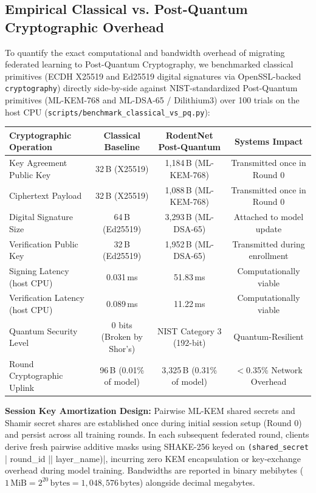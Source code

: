 \documentclass[11pt,a4paper]{article}
\begin{document}
\subsection{Empirical Classical vs. Post-Quantum Cryptographic Overhead}
To quantify the exact computational and bandwidth overhead of migrating federated learning to Post-Quantum Cryptography, we benchmarked classical primitives (ECDH X25519 and Ed25519 digital signatures via OpenSSL-backed \lstinline|cryptography|) directly side-by-side against NIST-standardized Post-Quantum primitives (ML-KEM-768 and ML-DSA-65 / Dilithium3) over 100 trials on the host CPU (\lstinline|scripts/benchmark_classical_vs_pq.py|):

\begin{center}
\begin{longtable}{@{}p{5.0cm}ccc@{}}
\toprule
\textbf{Cryptographic Operation} & \textbf{Classical Baseline} & \textbf{RodentNet Post-Quantum} & \textbf{Systems Impact} \\
\midrule
\endhead
Key Agreement Public Key & 32\,B (X25519) & 1{,}184\,B (ML-KEM-768) & Transmitted once in Round 0 \\
Ciphertext Payload & 32\,B (X25519) & 1{,}088\,B (ML-KEM-768) & Transmitted once in Round 0 \\
Digital Signature Size & 64\,B (Ed25519) & 3{,}293\,B (ML-DSA-65) & Attached to model update \\
Verification Public Key & 32\,B (Ed25519) & 1{,}952\,B (ML-DSA-65) & Transmitted during enrollment \\
Signing Latency (host CPU) & 0.031\,ms & 51.83\,ms & Computationally viable \\
Verification Latency (host CPU) & 0.089\,ms & 11.22\,ms & Computationally viable \\
Quantum Security Level & 0 bits (Broken by Shor's) & NIST Category 3 (192-bit) & Quantum-Resilient \\
Round Cryptographic Uplink & 96\,B (0.01\% of model) & 3{,}325\,B (0.31\% of model) & $<$0.35\% Network Overhead \\
\bottomrule
\end{longtable}
\end{center}

\textbf{Session Key Amortization Design:} Pairwise ML-KEM shared secrets and Shamir secret shares are established once during initial session setup (Round 0) and persist across all training rounds. In each subsequent federated round, clients derive fresh pairwise additive masks using SHAKE-256 keyed on \lstinline|(shared_secret || round_id || layer_name)|, incurring zero KEM encapsulation or key-exchange overhead during model training. Bandwidths are reported in binary mebibytes ($1\,\text{MiB} = 2^{20}\,\text{bytes} = 1{,}048{,}576\,\text{bytes}$) alongside decimal megabytes.
\end{document}
